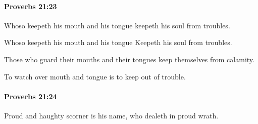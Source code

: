 		\paragraph{Proverbs 21:23} %
			\label{PROVERBS-21-23}

			Whoso keepeth his mouth and his tongue keepeth his soul from troubles.

			\begin{versebox}
					\item[BHS] 
					\item[ASV] Whoso keepeth his mouth and his tongue Keepeth his soul from troubles.
					\item[NIV] Those who guard their mouths and their tongues keep themselves from calamity.
					\item[NRSV] To watch over mouth and tongue is to keep out of trouble.
			\end{versebox}

		\paragraph{Proverbs 21:24} %
			\label{PROVERBS-21-24}

			Proud and haughty scorner is his name, who dealeth in proud wrath.

